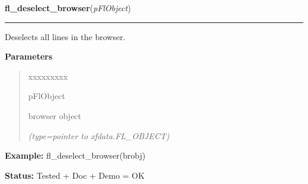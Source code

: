 \hspace{.8\funcindent}\begin{boxedminipage}{\funcwidth}

    \raggedright \textbf{fl\_deselect\_browser}(\textit{pFlObject})

    \vspace{-1.5ex}

    \rule{\textwidth}{0.5\fboxrule}
\setlength{\parskip}{2ex}
    Deselects all lines in the browser.

\setlength{\parskip}{1ex}
      \textbf{Parameters}
      \vspace{-1ex}

      \begin{quote}
        \begin{Ventry}{xxxxxxxxx}

          \item[pFlObject]

          browser object

            {\it (type=pointer to xfdata.FL\_OBJECT)}

        \end{Ventry}

      \end{quote}

\textbf{Example:} fl\_deselect\_browser(brobj)



\textbf{Status:} Tested + Doc + Demo = OK



    \end{boxedminipage}

    \label{xformslib:flbrowser:fl_isselected_browser_line}

    \vspace{0.5ex}

